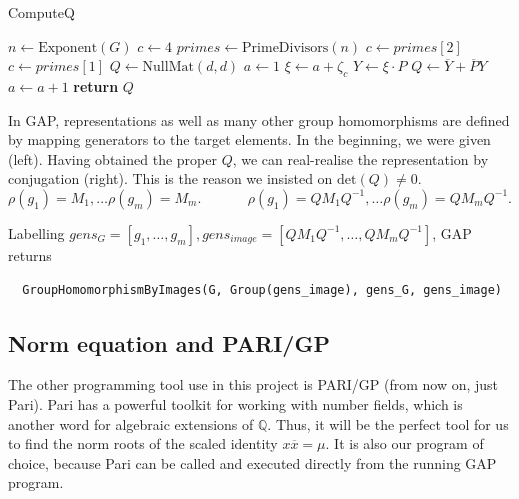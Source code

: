 \documentclass[11pt]{article}
\begin{document}
\begin{algorithm}
  \caption{ComputeQ}
  \label{alg:comp_q}
  \begin{algorithmic}
    \State $n \gets \text{Exponent}(G)$
      \State $c \gets 4$
    \Else
      \State $primes \gets \text{PrimeDivisors}(n)$
        \State $c \gets primes[2]$
      \Else
        \State $c \gets primes[1]$
      \EndIf
    \EndIf
    \State $Q \gets \text{NullMat}(d, d)$
    \State $a \gets 1$
      \State $\xi \gets a + \zeta_c$
      \State $Y \gets \xi \cdot P$
      \State $Q \gets \overline{Y} + \overline{P}Y$
      \State $a \gets a+1$
    \EndWhile
    \State \textbf{return} $Q$\
  \end{algorithmic}
\end{algorithm}

In GAP, representations as well as many other group homomorphisms are defined by mapping generators
to the target elements. In the beginning, we were given (left). Having obtained the proper $Q$, we
can real-realise the representation by conjugation (right). This is the reason we insisted on $\text{det}(Q) \neq 0$.
\[\rho(g_1) = M_1, \ldots \rho(g_m) = M_m.~~~~~~~~~~~~~~~\rho(g_1) = QM_1Q^{-1}, \ldots \rho(g_m) = QM_mQ^{-1}.\]

Labelling $gens_G = \left[g_1,\ldots,g_m\right], gens_{image} = \left[QM_1Q^{-1}, \ldots, QM_mQ^{-1}\right]$, GAP returns
\begin{verbatim}
  GroupHomomorphismByImages(G, Group(gens_image), gens_G, gens_image)
\end{verbatim}

\subsection{Norm equation and PARI/GP} \label{sec:pari}

The other programming tool use in this project is PARI/GP \cite{PARI2}
(from now on, just Pari). Pari has a powerful toolkit for working with number
fields, which is another word for algebraic extensions of $\mathbb{Q}$. Thus, it
will be the perfect tool for us to find the norm roots of the scaled identity
$x\overline{x}=\mu$. It is also our program of choice, because Pari can be called
and executed directly from the running GAP program.
\end{document}
